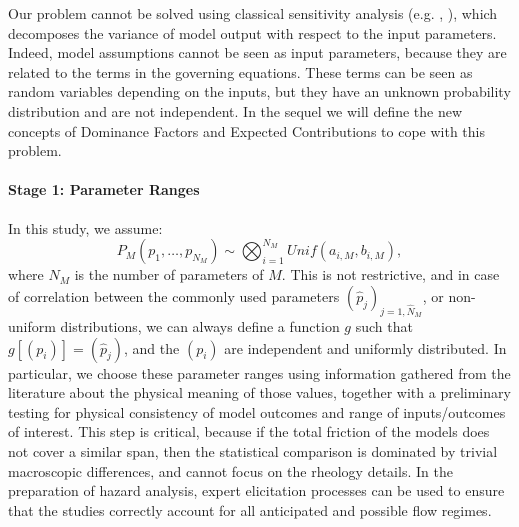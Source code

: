 \documentclass{article}
\begin{document}
Our problem cannot be solved using classical sensitivity analysis (e.g. \cite{Saltelli2010}, \cite{Weirs2012}), which decomposes the variance of model output with respect to the input parameters. Indeed, model assumptions cannot be seen as input parameters, because they are related to the terms in the governing equations. These terms can be seen as random variables depending on the inputs, but they have an unknown probability distribution and are not independent. In the sequel we will define the new concepts of Dominance Factors and Expected Contributions to cope with this problem.
%
\paragraph{Stage 1: Parameter Ranges} In this study, we assume:
$$P_M\left(p_1,\dots,p_{N_M}\right)\sim \bigotimes_{i=1}^{N_M} Unif(a_{i,M},b_{i,M}),$$
where $N_M$ is the number of parameters of $M$. This is not restrictive, and in case of correlation between the commonly used parameters $(\hat p_j)_{j=1,\hat N_M}$, or non-uniform distributions, we can always define a function $g$ such that $g[(p_i)]=(\hat p_j)$, and the $(p_i)$ are independent and uniformly distributed. In particular, we choose these parameter ranges using information gathered from the literature about the physical meaning of those values, together with a preliminary testing for physical consistency of model outcomes and range of inputs/outcomes of interest. {This step is critical, because if the total friction of the models does not cover a similar span, then the statistical comparison is dominated by trivial macroscopic differences, and cannot focus on the rheology details.}  In the preparation of hazard analysis, expert elicitation processes can be
used to ensure that the studies correctly account for all anticipated and possible flow regimes.
%
\end{document}
